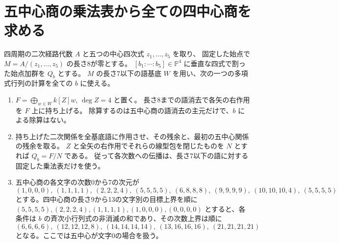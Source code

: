 \section{五中心商の乗法表から全ての四中心商を求める}
\label{sec:rank-fifteen-center-border}
\begin{proposition}\label{prop:five-center-border}
四周期の二次経路代数 $A$ と五つの中心四次式 $z_1,\ldots,z_5$ を取り、
固定した始点で $M=A/(z_1,\ldots,z_5)$ の長さ8が零とする。
$[b_1:\cdots:b_5]\in\mathbb P^4$ に垂直な四式で割った始点加群を $Q_b$ とする。
$M$ の長さ7以下の語基底 $W$ を用い、次の一つの多項式行列の計算を全ての $b$ に使える。
\begin{enumerate}
\item $F=\bigoplus_{w\in W}k[Z]w$, $\deg Z=4$ と置く。
長さ8までの語消去で各矢の右作用を $F$ 上に持ち上げる。
除算するのは五中心商の語消去の主元だけで、$b$ による除算はない。
\item 持ち上げた二次関係を全基底語に作用させ、その残余と、最初の五中心関係の残余を取る。
$Z$ と全矢の右作用でそれらの線型包を閉じたものを $N$ とすれば $Q_b=F/N$ である。
従って各次数への伝播は、長さ7以下の語に対する固定した乗法表だけを使う。
\item 五中心商の各文字の次数0から7の次元が
\[
 (1,0,0,0),\ (1,1,1,1),\ (2,2,2,4),\ (5,5,5,5),\
 (6,8,8,8),\ (9,9,9,9),\ (10,10,10,4),\ (5,5,5,5)
\]
とする。四中心商の長さ9から13の文字別の目標上界を順に
$(5,5,5,5),(2,2,2,4),(1,1,1,1),(1,0,0,0),(0,0,0,0)$
とすると、各条件は $b$ の斉次小行列式の非消滅の和であり、その次数上界は順に
\[
 (6,6,6,6),\ (12,12,12,8),\ (14,14,14,14),\ (13,16,16,16),\
 (21,21,21,21)
\]
となる。ここでは五中心が文字0の場合を扱う。
\end{enumerate}
\end{proposition}

